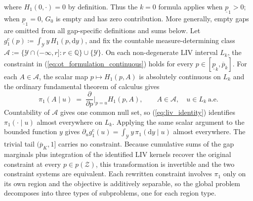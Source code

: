 where $H_1(0,\cdot)=0$ by definition. Thus the $k=0$ formula applies when $\underline p_1>0$; when $\underline p_1=0$, $G_0$ is empty and has zero contribution. More generally, empty gaps are omitted from all gap-specific definitions and sums below. Let $g_1^{\mathrm c}(p)\coloneqq\int_{\mathcal Y}y\,H_1(p,\mathrm{d}y)$, and fix the countable measure-determining class $\mathcal A:=\{\mathcal Y\cap(-\infty,r]:r\in\mathbb Q\}\cup\{\mathcal Y\}$. On each non-degenerate LIV interval $L_k$, the constraint in (\ref{eq:ot_formulation_continuous}) holds for every $p\in[\underline{p}_k,\overline{p}_k]$. For each $A\in\mathcal A$, the scalar map $p\mapsto H_1(p,A)$ is absolutely continuous on $L_k$ and the ordinary fundamental theorem of calculus gives
\begin{equation}\label{eq:liv_identity}
\pi_1(A\mid u) \;=\; \frac{\partial}{\partial p}\bigg|_{p=u}H_1(p,A),
\qquad A\in\mathcal A,\quad u\in L_k\ \text{a.e.}
\end{equation}
Countability of $\mathcal A$ gives one common null set, so (\ref{eq:liv_identity}) identifies $\pi_1(\cdot\mid u)$ almost everywhere on $L_k$. Applying the same scalar argument to the bounded function $y$ gives $\partial_u g_1^{\mathrm c}(u)=\int_{\mathcal Y}y\,\pi_1(\mathrm dy\mid u)$ almost everywhere. The trivial tail $(\overline{p}_K,1]$ carries no constraint. Because cumulative sums of the gap marginals plus integration of the identified LIV kernels recover the original constraint at every $p\in p(\mathcal{Z})$, this transformation is invertible and the two constraint systems are equivalent. Each rewritten constraint involves $\pi_1$ only on its own region and the objective is additively separable, so the global problem decomposes into three types of subproblems, one for each region type.

